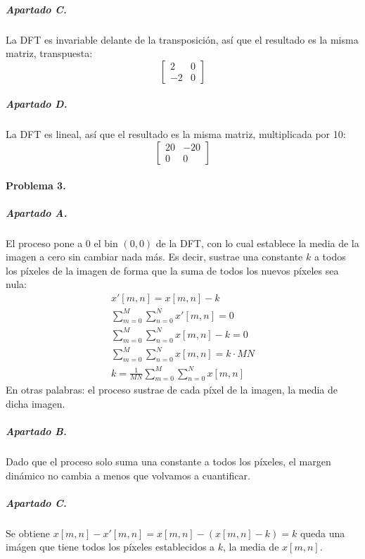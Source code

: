 \subparagraph{Apartado C.}

La DFT es invariable delante de la transposición, así que el resultado es la misma matriz,
transpuesta:
%
\begin{equation*}
  \begin{bmatrix}
    2 & 0 \\
    -2 & 0
  \end{bmatrix}
\end{equation*}

\subparagraph{Apartado D.}

La DFT es lineal, así que el resultado es la misma matriz, multiplicada por 10:
%
\begin{equation*}
  \begin{bmatrix}
    20 & -20 \\
    0 & 0
  \end{bmatrix}
\end{equation*}

\finishpage


\startpage

\paragraph{Problema 3.}

\subparagraph{Apartado A.}

El proceso pone a 0 el bin $(0, 0)$ de la DFT, con lo cual establece la media de la imagen
a cero sin cambiar nada más. Es decir, sustrae una constante $k$ a todos los píxeles de la imagen
de forma que la suma de todos los nuevos píxeles sea nula:
%
\begin{align*}
  x'[m, n] = x[m, n] - k \\
  \sum_{m=0}^{M} \sum_{n=0}^{N} x'[m, n] = 0 \\
  \sum_{m=0}^{M} \sum_{n=0}^{N} x[m, n] - k = 0 \\
  \sum_{m=0}^{M} \sum_{n=0}^{N} x[m, n] = k \cdot MN \\
  k = \frac{1}{MN} \sum_{m=0}^{M} \sum_{n=0}^{N} x[m, n]
\end{align*}
%
En otras palabras: el proceso sustrae de cada píxel de la imagen, la media de dicha imagen.

\subparagraph{Apartado B.}

Dado que el proceso solo suma una constante a todos los píxeles, el margen dinámico no cambia
a menos que volvamos a cuantificar.

\subparagraph{Apartado C.}

Se obtiene $x[m, n] - x'[m, n] = x[m, n] - (x[m, n] - k) = k$ queda una imágen que tiene todos
los píxeles establecidos a $k$, la media de $x[m, n]$.

